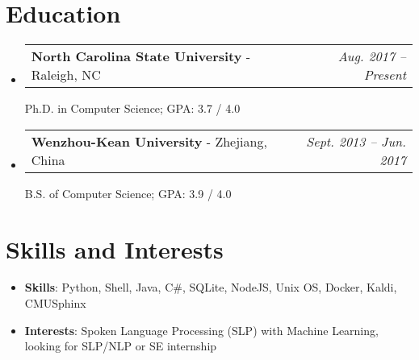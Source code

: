 \documentclass[letterpaper,11pt]{article}
\makeatletter
\newcommand{\resumeSubheading}[3]{
  \vspace{-1pt}\item
    \begin{tabular*}{0.97\textwidth}{l@{\extracolsep{\fill}}r}
      \textbf{#1} - #2  & \textit{\small #3}
    \end{tabular*}\vspace{-5pt}
}
\newcommand{\resumeSubHeadingListStart}{\begin{itemize}[label={},leftmargin=*]}
\newcommand{\resumeSubHeadingListEnd}{\end{itemize}}
\makeatother
\begin{document}


\section{Education}
  \resumeSubHeadingListStart
    \resumeSubheading
      {North Carolina State University}{Raleigh, NC}
      {Aug. 2017 -- Present}
      
      Ph.D. in Computer Science;  GPA: 3.7 / 4.0
    \resumeSubheading
      {Wenzhou-Kean University}{Zhejiang, China}
      {Sept. 2013 -- Jun. 2017}

      B.S. of Computer Science; GPA: 3.9 / 4.0
  \resumeSubHeadingListEnd

\section{Skills and Interests}
 \resumeSubHeadingListStart
   \item{
     \textbf{Skills}{: Python, Shell, Java, C\#, SQLite, NodeJS, Unix OS, Docker, Kaldi, CMU\-Sphinx}}
  \item{
    \textbf{Interests}{: Spoken Language Processing (SLP) with Machine Learning, looking for SLP/NLP or SE internship}}
 \resumeSubHeadingListEnd


\end{document}
